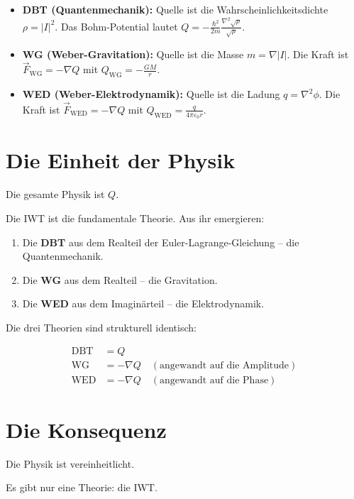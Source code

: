 \begin{itemize}
\item \textbf{DBT (Quantenmechanik):} Quelle ist die Wahrscheinlichkeitsdichte \( \rho = |I|^2 \). Das Bohm-Potential lautet \( Q = -\frac{\hbar^2}{2m} \frac{\nabla^2 \sqrt{\rho}}{\sqrt{\rho}} \).

\item \textbf{WG (Weber-Gravitation):} Quelle ist die Masse \( m = \nabla |I| \). Die Kraft ist \( \vec{F}_{\text{WG}} = -\nabla Q \) mit \( Q_{\text{WG}} = -\frac{GM}{r} \).

\item \textbf{WED (Weber-Elektrodynamik):} Quelle ist die Ladung \( q = \nabla^2 \phi \). Die Kraft ist \( \vec{F}_{\text{WED}} = -\nabla Q \) mit \( Q_{\text{WED}} = \frac{q}{4\pi \varepsilon_0 r} \).
\end{itemize}

\section{Die Einheit der Physik}

Die gesamte Physik ist \( Q \).

Die IWT ist die fundamentale Theorie. Aus ihr emergieren:

\begin{enumerate}
\item Die \textbf{DBT} aus dem Realteil der Euler-Lagrange-Gleichung – die Quantenmechanik.
\item Die \textbf{WG} aus dem Realteil – die Gravitation.
\item Die \textbf{WED} aus dem Imaginärteil – die Elektrodynamik.
\end{enumerate}

Die drei Theorien sind strukturell identisch:

\[
\begin{aligned}
\text{DBT} &= Q \\
\text{WG} &= -\nabla Q \quad (\text{angewandt auf die Amplitude}) \\
\text{WED} &= -\nabla Q \quad (\text{angewandt auf die Phase})
\end{aligned}
\]

\section{Die Konsequenz}

Die Physik ist vereinheitlicht.

Es gibt nur eine Theorie: die IWT.

